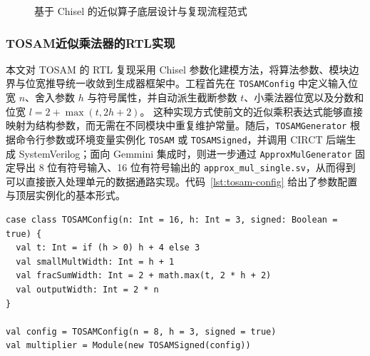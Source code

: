 \documentclass[12pt,a4paper,UTF8]{article}
\begin{document}
\begin{figure}[htbp]
    \centering
    \caption{基于 Chisel 的近似算子底层设计与复现流程范式}
    \label{fig:chisel-flow}
\end{figure}

\subsubsection{TOSAM近似乘法器的RTL实现}

本文对 TOSAM 的 RTL 复现采用 Chisel 参数化建模方法，将算法参数、模块边界与位宽推导统一收敛到生成器框架中。工程首先在 \texttt{TOSAMConfig} 中定义输入位宽 $n$、舍入参数 $h$ 与符号属性，并自动派生截断参数 $t$、小乘法器位宽以及分数和位宽
\(
l=2+\max(t,2h+2)
\)。
这种实现方式使前文的近似乘积表达式能够直接映射为结构参数，而无需在不同模块中重复维护常量。随后，\texttt{TOSAMGenerator} 根据命令行参数或环境变量实例化 \texttt{TOSAM} 或 \texttt{TOSAMSigned}，并调用 CIRCT 后端生成 SystemVerilog；面向 Gemmini 集成时，则进一步通过 \texttt{ApproxMulGenerator} 固定导出 8 位有符号输入、16 位有符号输出的 \texttt{approx\_mul\_single.sv}，从而得到可以直接嵌入处理单元的数据通路实现。代码~\ref{lst:tosam-config} 给出了参数配置与顶层实例化的基本形式。

\begin{lstlisting}[caption={TOSAM 的参数化配置与顶层实例化方式},label={lst:tosam-config},basicstyle=\ttfamily\small]
case class TOSAMConfig(n: Int = 16, h: Int = 3, signed: Boolean = true) {
  val t: Int = if (h > 0) h + 4 else 3
  val smallMultWidth: Int = h + 1
  val fracSumWidth: Int = 2 + math.max(t, 2 * h + 2)
  val outputWidth: Int = 2 * n
}

val config = TOSAMConfig(n = 8, h = 3, signed = true)
val multiplier = Module(new TOSAMSigned(config))
\end{lstlisting}
\end{document}
